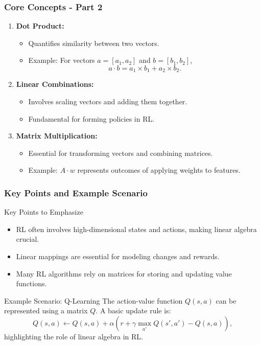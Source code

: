 \documentclass[aspectratio=169]{beamer}
\begin{document}
\begin{frame}[fragile]
    \frametitle{Core Concepts - Part 2}
    \begin{enumerate}[resume]
        \item \textbf{Dot Product:}
            \begin{itemize}
                \item Quantifies similarity between two vectors.
                \item Example: For vectors \(a = [a_1, a_2]\) and \(b = [b_1, b_2]\),
                \[
                a \cdot b = a_1 \times b_1 + a_2 \times b_2.
                \]
            \end{itemize}

        \item \textbf{Linear Combinations:}
            \begin{itemize}
                \item Involves scaling vectors and adding them together.
                \item Fundamental for forming policies in RL.
            \end{itemize}

        \item \textbf{Matrix Multiplication:}
            \begin{itemize}
                \item Essential for transforming vectors and combining matrices.
                \item Example: \(A \cdot w\) represents outcomes of applying weights to features.
            \end{itemize}
    \end{enumerate}
\end{frame}

\begin{frame}[fragile]
    \frametitle{Key Points and Example Scenario}
    \begin{block}{Key Points to Emphasize}
        \begin{itemize}
            \item RL often involves high-dimensional states and actions, making linear algebra crucial.
            \item Linear mappings are essential for modeling changes and rewards.
            \item Many RL algorithms rely on matrices for storing and updating value functions.
        \end{itemize}
    \end{block}

    \begin{block}{Example Scenario: Q-Learning}
        The action-value function \(Q(s, a)\) can be represented using a matrix \(Q\). A basic update rule is:
        \[
        Q(s, a) \leftarrow Q(s, a) + \alpha \left( r + \gamma \max_{a'} Q(s', a') - Q(s, a) \right),
        \]
        highlighting the role of linear algebra in RL.
    \end{block}
\end{frame}
\end{document}
